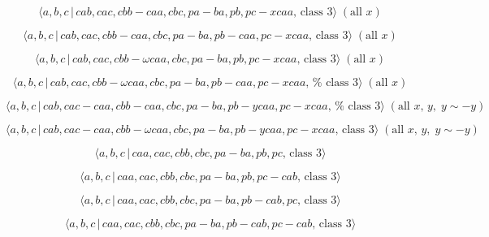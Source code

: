 \documentclass[10pt]{article}
\begin{document}
\begin{equation}
\langle a,b,c\,|\,cab,cac,cbb-caa,cbc,pa-ba,pb,pc-xcaa,\,\text{class }%
3\rangle \;(\text{all }x)  \tag{7.1256}
\end{equation}

\begin{equation}
\langle a,b,c\,|\,cab,cac,cbb-caa,cbc,pa-ba,pb-caa,pc-xcaa,\,\text{class }%
3\rangle \;(\text{all }x)  \tag{7.1257}
\end{equation}

\begin{equation}
\langle a,b,c\,|\,cab,cac,cbb-\omega caa,cbc,pa-ba,pb,pc-xcaa,\,\text{class }%
3\rangle \;(\text{all }x)  \tag{7.1258}
\end{equation}

\begin{equation}
\langle a,b,c\,|\,cab,cac,cbb-\omega caa,cbc,pa-ba,pb-caa,pc-xcaa,\,\text{%
class }3\rangle \;(\text{all }x)  \tag{7.1259}
\end{equation}

\begin{equation}
\langle a,b,c\,|\,cab,cac-caa,cbb-caa,cbc,pa-ba,pb-ycaa,pc-xcaa,\,\text{%
class }3\rangle \;(\text{all }x,\,y,\;y\sim -y)  \tag{7.1260}
\end{equation}

\begin{equation}
\langle a,b,c\,|\,cab,cac-caa,cbb-\omega caa,cbc,pa-ba,pb-ycaa,pc-xcaa,\,%
\text{class }3\rangle \;(\text{all }x,\,y,\;y\sim -y)  \tag{7.1261}
\end{equation}

\begin{equation}
\langle a,b,c\,|\,caa,cac,cbb,cbc,pa-ba,pb,pc,\,\text{class }3\rangle 
\tag{7.1262}
\end{equation}

\begin{equation}
\langle a,b,c\,|\,caa,cac,cbb,cbc,pa-ba,pb,pc-cab,\,\text{class }3\rangle 
\tag{7.1263}
\end{equation}

\begin{equation}
\langle a,b,c\,|\,caa,cac,cbb,cbc,pa-ba,pb-cab,pc,\,\text{class }3\rangle 
\tag{7.1264}
\end{equation}

\begin{equation}
\langle a,b,c\,|\,caa,cac,cbb,cbc,pa-ba,pb-cab,pc-cab,\,\text{class }3\rangle
\tag{7.1265}
\end{equation}
\end{document}
